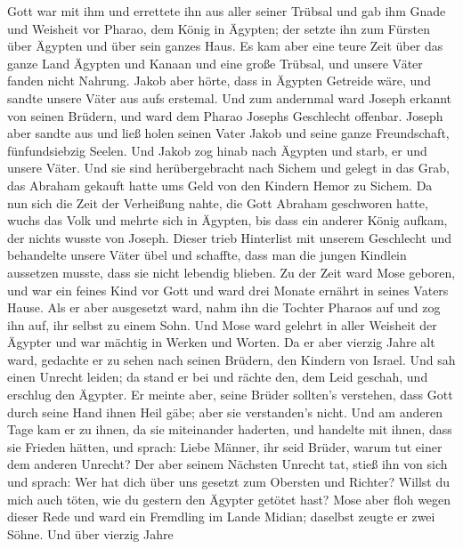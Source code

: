 Gott war mit ihm  und errettete ihn aus aller seiner
Trübsal und gab ihm Gnade und Weisheit vor Pharao, dem König in Ägypten;
der setzte ihn zum Fürsten über Ägypten und über sein ganzes Haus.
 Es kam aber eine teure Zeit über das ganze Land Ägypten
und Kanaan und eine große Trübsal, und unsere Väter fanden nicht
Nahrung.  Jakob aber hörte, dass in Ägypten Getreide wäre,
und sandte unsere Väter aus aufs erstemal.  Und zum
andernmal ward Joseph erkannt von seinen Brüdern, und ward dem Pharao
Josephs Geschlecht offenbar.  Joseph aber sandte aus und
ließ holen seinen Vater Jakob und seine ganze Freundschaft,
fünfundsiebzig Seelen.  Und Jakob zog hinab nach Ägypten
und starb, er und unsere Väter.  Und sie sind
herübergebracht nach Sichem und gelegt in das Grab, das Abraham gekauft
hatte ums Geld von den Kindern Hemor zu Sichem.  Da nun
sich die Zeit der Verheißung nahte, die Gott Abraham geschworen hatte,
wuchs das Volk und mehrte sich in Ägypten,  bis dass ein
anderer König aufkam, der nichts wusste von Joseph.  Dieser
trieb Hinterlist mit unserem Geschlecht und behandelte unsere Väter übel
und schaffte, dass man die jungen Kindlein aussetzen musste, dass sie
nicht lebendig blieben.  Zu der Zeit ward Mose geboren, und
war ein feines Kind vor Gott und ward drei Monate ernährt in seines
Vaters Hause.  Als er aber ausgesetzt ward, nahm ihn die
Tochter Pharaos auf und zog ihn auf, ihr selbst zu einem Sohn.
 Und Mose ward gelehrt in aller Weisheit der Ägypter und
war mächtig in Werken und Worten.  Da er aber vierzig Jahre
alt ward, gedachte er zu sehen nach seinen Brüdern, den Kindern von
Israel.  Und sah einen Unrecht leiden; da stand er bei und
rächte den, dem Leid geschah, und erschlug den Ägypter.  Er
meinte aber, seine Brüder sollten's verstehen, dass Gott durch seine
Hand ihnen Heil gäbe; aber sie verstanden's nicht.  Und am
anderen Tage kam er zu ihnen, da sie miteinander haderten, und handelte
mit ihnen, dass sie Frieden hätten, und sprach: Liebe Männer, ihr seid
Brüder, warum tut einer dem anderen Unrecht?  Der aber
seinem Nächsten Unrecht tat, stieß ihn von sich und sprach: Wer hat dich
über uns gesetzt zum Obersten und Richter?  Willst du mich
auch töten, wie du gestern den Ägypter getötet hast?  Mose
aber floh wegen dieser Rede und ward ein Fremdling im Lande Midian;
daselbst zeugte er zwei Söhne.  Und über vierzig Jahre
